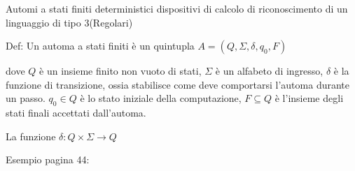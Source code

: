 Automi a stati finiti deterministici
dispositivi di calcolo di riconoscimento di un linguaggio di tipo 3(Regolari)

Def: Un automa a stati finiti è un quintupla $A = (Q,\Sigma,\delta, q_0, F)$

dove $Q$ è un insieme finito non vuoto di stati,
$\Sigma$ è un alfabeto di ingresso,
$\delta$ è la funzione di transizione, ossia stabilisce come deve comportarsi l'automa durante un passo.
$q_0 \in Q$ è lo stato iniziale della computazione,
$F \subseteq Q$ è l'insieme degli stati finali accettati dall'automa.

La funzione $\delta: Q \times \Sigma \to Q$

Esempio pagina 44:
